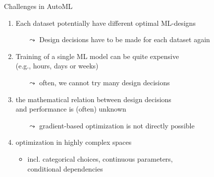 \begin{frame}[c]{Challenges in AutoML}

\begin{enumerate}
  \item Each dataset potentially have \alert{different optimal ML-designs}
  \begin{itemize}
    \item[$\leadsto$] Design decisions have to be made for each dataset again
  \end{itemize}
  \smallskip
  \pause
  \item Training of a single ML model can be quite \alert{expensive}\\
  		(e.g., hours, days or weeks)
  \begin{itemize}
    \item[$\leadsto$] often, we cannot try many design decisions
  \end{itemize}
  \smallskip
  \pause
  \item the \alert{mathematical relation} between design decisions\\ and performance is (often) \alert{unknown}
  \begin{itemize}
    \item[$\leadsto$] gradient-based optimization is not directly possible
  \end{itemize}
  \smallskip
  \pause
  \item optimization in \alert{highly complex spaces}
  \begin{itemize}
    \item incl. categorical choices, continuous parameters,\\ conditional dependencies
  \end{itemize}
  
\end{enumerate}

\end{frame}
